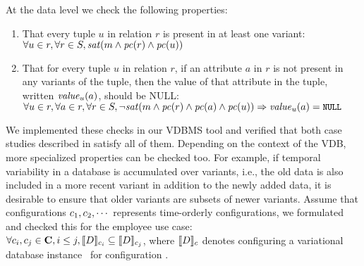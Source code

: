 \noindent
%
At the data level we check the following properties:
%
\begin{enumerate}
%
\item That every tuple $u$ in relation $r$ is present in at least one variant:\\
%
$\forall\vTuple\in\vRel, \forall\vRel\in\vSch,
\sat{\fModel\wedge\getPC\vRel\wedge\getPC\vTuple}$ 
%
\item That for every tuple $u$ in relation $r$, if an attribute $a$ in $r$ is
not present in any variants of the tuple, then the value of that attribute in
the tuple, written $\mathit{value}_\vTuple(\vAtt)$, should be NULL:\\
$\forall\vTuple\in\vRel, \forall\vAtt\in\vRel, \forall\vRel\in\vSch,
\neg\sat{\fModel\wedge\getPC\vRel\wedge\getPC\vAtt\wedge\getPC\vTuple}
\Rightarrow \mathit{value}_\vTuple(\vAtt) = \NULL$
%
\end{enumerate}


\noindent
%
We implemented these checks in our VDBMS tool and verified that both case
studies described in  satisfy all of them. 
%
Depending on the context of the VDB, 
more specialized properties can be checked too. For example, if temporal 
variability in a database is accumulated over variants, i.e., the old data
is also included in a more recent variant in addition to the newly added data,
it is desirable
to ensure that older variants are subsets of newer variants. 
Assume that configurations \ensuremath{\config_1, \config_2, \cdots}
represents time-orderly configurations, we formulated
and checked this for the employee use case:\\
\ensuremath{
\forall \config_i, \config_j \in \confSet, i \le j, \sem[\config_i] {\vDB} \subseteq \sem[\config_j]{\vDB}
}, 
where \ensuremath{\sem[\config]{\vDB}} denotes configuring a variational database instance
\vDB\ for configuration \config. 


